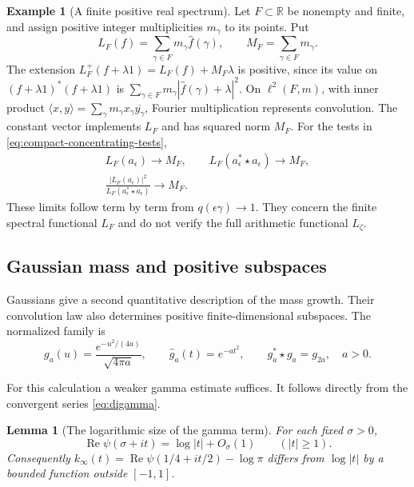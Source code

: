 \documentclass[11pt]{article}
\newtheorem{lemma}[theorem]{Lemma}
\theoremstyle{definition}
\newtheorem{example}[theorem]{Example}
\theoremstyle{remark}
\numberwithin{equation}{section}
\newcommand{\R}{\mathbb R}
\begin{document}
\begin{example}[A finite positive real spectrum]
\label{ex:weil-finite-spectrum}
Let $F\subset\R$ be nonempty and finite, and assign positive integer
multiplicities $m_\gamma$ to its points.  Put
\[
 L_F(f)=\sum_{\gamma\in F}m_\gamma\widehat f(\gamma),\qquad
 M_F=\sum_{\gamma\in F}m_\gamma.
\]
The extension $L_F^+(f+\lambda1)=L_F(f)+M_F\lambda$ is positive, since
its value on $(f+\lambda1)^*(f+\lambda1)$ is
$\sum_{\gamma\in F}m_\gamma|\widehat f(\gamma)+\lambda|^2$.
On $\ell^2(F,m)$, with inner product
$\langle x,y\rangle=\sum_\gamma m_\gamma x_\gamma\overline{y_\gamma}$,
Fourier multiplication represents convolution.
The constant vector implements $L_F$ and has squared norm $M_F$.
For the tests in \eqref{eq:compact-concentrating-tests},
\[
 \begin{gathered}
 L_F(a_\epsilon)\longrightarrow M_F,\qquad
 L_F(a_\epsilon^*\star a_\epsilon)\longrightarrow M_F,\\
 \frac{|L_F(a_\epsilon)|^2}
      {L_F(a_\epsilon^*\star a_\epsilon)}\longrightarrow M_F.
 \end{gathered}
\]
These limits follow term by term from $q(\epsilon\gamma)\to1$.
They concern the finite spectral functional $L_F$ and do not verify
the full arithmetic functional $L_\zeta$.
\end{example}

\subsection{Gaussian mass and positive subspaces}

Gaussians give a second quantitative description of the mass growth.
Their convolution law also determines positive finite-dimensional
subspaces.  The normalized family is
\begin{equation}
 g_a(u)=\frac{e^{-u^2/(4a)}}{\sqrt{4\pi a}},
 \qquad \widehat g_a(t)=e^{-at^2},
 \qquad g_a^*\star g_a=g_{2a},\quad a>0.
 \label{eq:gaussian-semigroup}
\end{equation}

For this calculation a weaker gamma estimate suffices.
It follows directly from the convergent series \eqref{eq:digamma}.

\begin{lemma}[The logarithmic size of the gamma term]
\label{lem:gamma-log-size}
For each fixed $\sigma>0$,
\[
 \operatorname{Re}\psi(\sigma+it)=\log|t|+O_\sigma(1)
 \qquad(|t|\geq1).
\]
Consequently $k_\infty(t)=\operatorname{Re}\psi(1/4+it/2)-\log\pi$
differs from $\log|t|$ by a bounded function outside $[-1,1]$.
\end{lemma}
\end{document}

